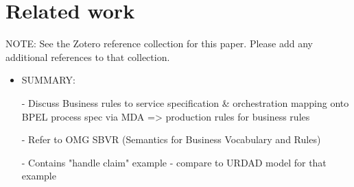 \section{Related work \label{sec:relatedWork}}

NOTE: See the Zotero reference collection for this paper. Please add any additional references to that collection.

\begin{itemize}
 \item SUMMARY:

- Discuss Business rules to service specification & orchestration mapping onto BPEL process spec via MDA => production rules for business rules

- Refer to OMG SBVR (Semantics for Business Vocabulary and Rules)

- Contains "handle claim" example - compare to URDAD model for that example

\end{itemize}
